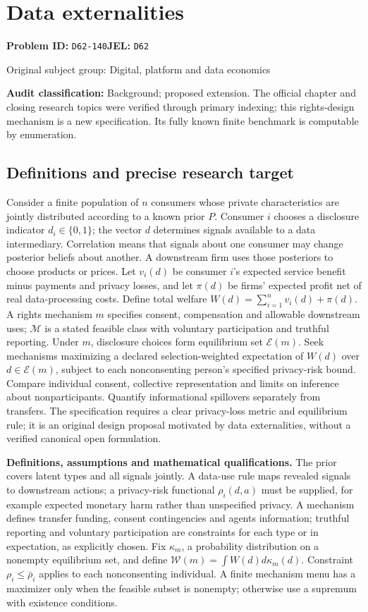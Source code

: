 \documentclass[11pt,a4paper]{article}
\begin{document}
\section*{Data externalities}
\textbf{Problem ID:} \texttt{D62-140}\quad \textbf{JEL:} \texttt{D62}\par
\label{problem:OP-0407}
{\sffamily\small\color{muted}Original subject group: Digital, platform and data economics\par}
\label{definitions:problem:30007689}
\textbf{Audit classification:} Background; proposed extension. The official chapter and closing research topics were verified through primary indexing; this rights-design mechanism is a new specification. Its fully known finite benchmark is computable by enumeration.
\subsection*{Definitions and precise research target}
Consider a finite population of \(n\) consumers whose private characteristics are jointly distributed according to a known prior \(P\). Consumer \(i\) chooses a disclosure indicator \(d_i\in\{0,1\}\); the vector \(d\) determines signals available to a data intermediary. Correlation means that signals about one consumer may change posterior beliefs about another. A downstream firm uses those posteriors to choose products or prices. Let \(v_i(d)\) be consumer \(i\)'s expected service benefit minus payments and privacy losses, and let \(\pi(d)\) be firms' expected profit net of real data-processing costs. Define total welfare \(W(d)=\sum_{i=1}^n v_i(d)+\pi(d)\). A rights mechanism \(m\) specifies consent, compensation and allowable downstream uses; \(\mathcal M\) is a stated feasible class with voluntary participation and truthful reporting. Under \(m\), disclosure choices form equilibrium set \(\mathcal E(m)\). Seek mechanisms maximizing a declared selection-weighted expectation of \(W(d)\) over \(d\in\mathcal E(m)\), subject to each nonconsenting person's specified privacy-risk bound. Compare individual consent, collective representation and limits on inference about nonparticipants. Quantify informational spillovers separately from transfers. The specification requires a clear privacy-loss metric and equilibrium rule; it is an original design proposal motivated by data externalities, without a verified canonical open formulation.

\textbf{Definitions, assumptions and mathematical qualifications.} The prior covers latent types and all signals jointly. A data-use rule maps revealed signals to downstream actions; a privacy-risk functional \(\rho_i(d,a)\) must be supplied, for example expected monetary harm rather than unspecified privacy. A mechanism defines transfer funding, consent contingencies and agents information; truthful reporting and voluntary participation are constraints for each type or in expectation, as explicitly chosen. Fix \(\kappa_m\), a probability distribution on a nonempty equilibrium set, and define \(\mathcal W(m)=\int W(d)d\kappa_m(d)\). Constraint \(\rho_i\leq\bar\rho_i\) applies to each nonconsenting individual. A finite mechanism menu has a maximizer only when the feasible subset is nonempty; otherwise use a supremum with existence conditions.
\end{document}
